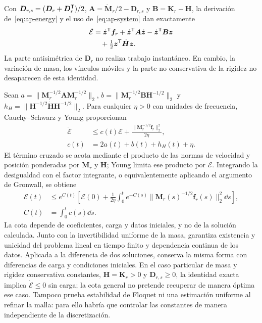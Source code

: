 Con $\bm D_{r,s}=(\bm D_r+\bm D_r^\mathsf T)/2$, $\bm A=\dot{\bm M}_r/2-\bm D_{r,s}$ y $\bm B=\bm K_r-\bm H$, la derivación de~\eqref{eq:ap-energy} y el uso de~\eqref{eq:ap-system} dan exactamente
\begin{align}
\dot{\mathcal E}&=\dot{\bm z}^\mathsf T\bm f_r+\dot{\bm z}^\mathsf T\bm A\dot{\bm z}
-\dot{\bm z}^\mathsf T\bm B\bm z\nonumber\\
&\quad+\tfrac12\bm z^\mathsf T\dot{\bm H}\bm z.
\label{eq:ap-identity}
\end{align}
La parte antisimétrica de $\bm D_r$ no realiza trabajo instantáneo. En cambio, la variación de masa, los vínculos móviles y la parte no conservativa de la rigidez no desaparecen de esta identidad.

Sean $a=\|\bm M_r^{-1/2}\bm A\bm M_r^{-1/2}\|_2$, $b=\|\bm M_r^{-1/2}\bm B\bm H^{-1/2}\|_2$ y $h_H=\|\bm H^{-1/2}\dot{\bm H}\bm H^{-1/2}\|_2$. Para cualquier $\eta>0$ con unidades de frecuencia, Cauchy--Schwarz y Young proporcionan
\begin{align}
\dot{\mathcal E}&\le c(t)\mathcal E+
\frac{\|\bm M_r^{-1/2}\bm f_r\|_2^2}{2\eta},\nonumber\\
c(t)&=2a(t)+b(t)+h_H(t)+\eta.
\label{eq:ap-differential}
\end{align}
El término cruzado se acota mediante el producto de las normas de velocidad y posición ponderadas por $\bm M_r$ y $\bm H$; Young limita ese producto por $\mathcal E$. Integrando la desigualdad con el factor integrante, o equivalentemente aplicando el argumento de Gronwall, se obtiene
\begin{align}
\mathcal E(t)&\le e^{C(t)}\left[\mathcal E(0)+\frac1{2\eta}
\int_0^t e^{-C(s)}\|\bm M_r(s)^{-1/2}\bm f_r(s)\|_2^2\dd s\right],\nonumber\\
C(t)&=\int_0^t c(s)\dd s.
\label{eq:ap-bound}
\end{align}
La cota depende de coeficientes, carga y datos iniciales, y no de la solución calculada. Junto con la invertibilidad uniforme de la masa, garantiza existencia y unicidad del problema lineal en tiempo finito y dependencia continua de los datos. Aplicada a la diferencia de dos soluciones, conserva la misma forma con diferencias de carga y condiciones iniciales. En el caso particular de masa y rigidez conservativa constantes, $\bm H=\bm K_r>0$ y $\bm D_{r,s}\ge0$, la identidad exacta implica $\dot{\mathcal E}\le0$ sin carga; la cota general no pretende recuperar de manera óptima ese caso. Tampoco prueba estabilidad de Floquet ni una estimación uniforme al refinar la malla: para ello habría que controlar las constantes de manera independiente de la discretización.

